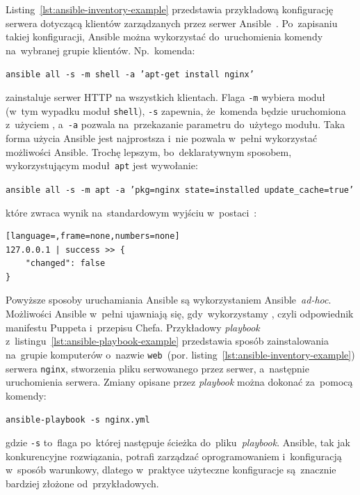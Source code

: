 \documentclass[thesis]{subfiles}
\begin{document}
Listing~\ref{lst:ansible-inventory-example} przedstawia przykładową konfigurację serwera dotyczącą klientów zarządzanych przez serwer Ansible~\cite{ansible-example}. Po~zapisaniu takiej konfiguracji, Ansible można wykorzystać do~uruchomienia komendy na~wybranej grupie klientów. Np.~komenda:\mynobreakpar
\begin{center}
\texttt{ansible all -s -m shell -a 'apt-get install nginx'}
\end{center}
zainstaluje serwer HTTP  na wszystkich klientach. Flaga \texttt{-m} wybiera moduł (w~tym wypadku moduł \texttt{shell}), \texttt{-s} zapewnia, że~komenda będzie uruchomiona z~użyciem , a~\texttt{-a} pozwala na~przekazanie parametru do~użytego modułu. Taka forma użycia Ansible jest najprostsza i~nie pozwala w~pełni wykorzystać możliwości Ansible. Trochę lepszym, bo~deklaratywnym sposobem, wykorzystującym moduł~\texttt{apt} jest wywołanie:\mynobreakpar
\begin{center}
\texttt{ansible all -s -m apt -a 'pkg=nginx state=installed update\_cache=true'}
\end{center}
które zwraca wynik na~standardowym wyjściu w~postaci~\json{}:\mynobreakpar
\begin{lstlisting}[language=,frame=none,numbers=none]
127.0.0.1 | success >> {
    "changed": false
}
\end{lstlisting}
Powyższe sposoby uruchamiania Ansible są wykorzystaniem Ansible~\emph{ad-hoc}. Możliwości Ansible w~pełni ujawniają się, gdy~wykorzystamy , czyli odpowiednik manifestu Puppeta i~przepisu Chefa. Przykładowy \emph{playbook} z~listingu~\ref{lst:ansible-playbook-example} przedstawia sposób zainstalowania na~grupie komputerów o~nazwie \texttt{web}~(por. listing~\ref{lst:ansible-inventory-example}) serwera \texttt{nginx}, stworzenia pliku serwowanego przez serwer, a~następnie uruchomienia  serwera. Zmiany opisane przez \emph{playbook} można dokonać za~pomocą komendy:\mynobreakpar
\begin{center}
\texttt{ansible-playbook -s nginx.yml}
\end{center}
gdzie \texttt{-s} to~flaga po~której następuje ścieżka do~pliku~\emph{playbook}. Ansible, tak jak konkurencyjne rozwiązania, potrafi zarządzać oprogramowaniem i~konfiguracją w~sposób warunkowy, dlatego w~praktyce użyteczne konfiguracje są~znacznie bardziej złożone od~przykładowych.
\end{document}
